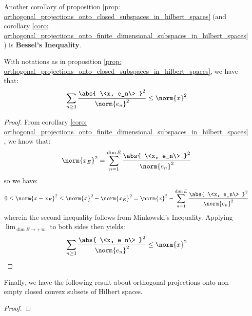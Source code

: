         Another corollary of proposition \ref{prop: orthogonal_projections_onto_closed_subspaces_in_hilbert_spaces} (and corollary \ref{coro: orthogonal_projections_onto_finite_dimensional_subspaces_in_hilbert_spaces}) is \textbf{Bessel's Inequality}.
        \begin{corollary} \label{coro: bessel_inequality}
            With notations as in proposition \ref{prop: orthogonal_projections_onto_closed_subspaces_in_hilbert_spaces}, we have that:
                $$\sum_{n \geq 1} \frac{ \abs{ \<x, e_n\> }^2 }{\norm{e_n}^2} \leq \norm{x}^2$$
        \end{corollary}
            \begin{proof}
                From corollary \ref{coro: orthogonal_projections_onto_finite_dimensional_subspaces_in_hilbert_spaces}, we know that:
                    $$\norm{x_E}^2 = \sum_{n = 1}^{\dim E} \frac{ \abs{ \<x, e_n\> }^2 }{\norm{e_n}^2}$$
                so we have:
                    $$0 \leq \norm{x - x_E}^2 \leq \norm{x}^2 - \norm{x_E}^2 = \norm{x}^2 - \sum_{n = 1}^{\dim E} \frac{ \abs{ \<x, e_n\> }^2 }{\norm{e_n}^2}$$
                wherein the second inequality follows from Minkowski's Inequality. Applying $\lim_{\dim E \to +\infty}$ to both sides then yields:
                    $$\sum_{n \geq 1} \frac{ \abs{ \<x, e_n\> }^2 }{\norm{e_n}^2} \leq \norm{x}^2$$
            \end{proof}
        Finally, we have the following result about orthogonal projections onto non-empty closed convex subsets of Hilbert spaces.
        \begin{corollary}
            
        \end{corollary}
            \begin{proof}
                
            \end{proof}
            
